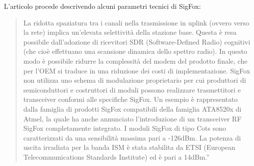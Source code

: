 \documentclass[a4paper]{report} %
\begin{document}
L'articolo \cite{art:rif.23} procede descrivendo alcuni parametri tecnici di SigFox:
\begin{quote}
	La ridotta spaziatura tra i canali nella trasmissione in uplink (ovvero verso la rete) implica un'elevata selettività della stazione base. Questa è resa possibile dall'adozione di ricevitori SDR (Software-Defined Radio) cognitivi (che cioè effettuano una scansione dinamica dello spettro radio). In questo modo è possibile ridurre la complessità del modem del prodotto finale, che per l'OEM si traduce in una riduzione dei costi di implementazione. SigFox non utilizza uno schema di modulazione proprietario per cui produttori di semiconduttori e costruttori di moduli possono realizzare trasmettitori e transceiver conformi alle specifiche SigFox. Un esempio è rappresentato dalla famiglia di prodotti SigFox compatibili della famiglia ATA8520x di Atmel, la quale ha anche annunciato l'introduzione di un transceiver RF SigFox completamente integrato. I moduli SigFox di tipo Cots sono caratterizzati da una sensibilità massima pari a -126dBm. La potenza di uscita irradiata per la banda ISM è stata stabilita da ETSI (European Telecommunications Standards Institute) ed è pari a 14dBm.''
\end{quote}
\end{document}
